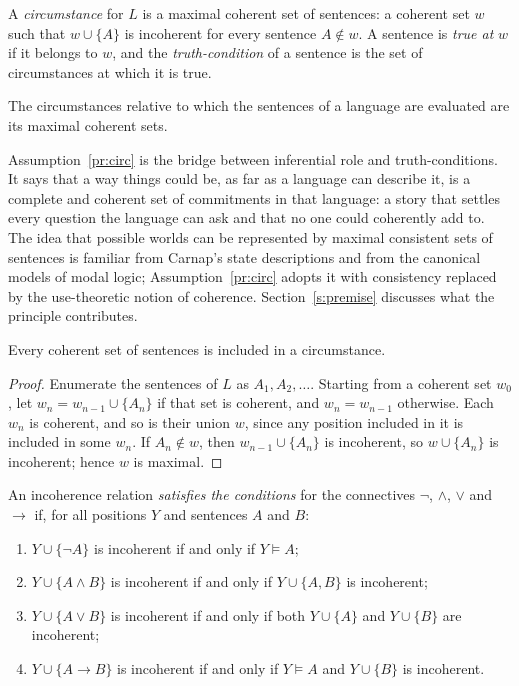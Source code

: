 \documentclass{situationist-preprint}
\begin{document}
\begin{definition}[Circumstance]\label{d:circ}
A \emph{circumstance} for $L$ is a maximal coherent set of sentences: a coherent set $w$ such that $w \cup \{A\}$ is incoherent for every sentence $A \notin w$. A sentence is \emph{true at} $w$ if it belongs to $w$, and the \emph{truth-condition} of a sentence is the set of circumstances at which it is true.
\end{definition}

\begin{assumption}[Circumstances]\label{pr:circ}
The circumstances relative to which the sentences of a language are evaluated are its maximal coherent sets.
\end{assumption}

Assumption~\ref{pr:circ} is the bridge between inferential role and truth-conditions. It says that a way things could be, as far as a language can describe it, is a complete and coherent set of commitments in that language: a story that settles every question the language can ask and that no one could coherently add to. The idea that possible worlds can be represented by maximal consistent sets of sentences is familiar from Carnap's state descriptions and from the canonical models of modal logic; Assumption~\ref{pr:circ} adopts it with consistency replaced by the use-theoretic notion of coherence. Section~\ref{s:premise} discusses what the principle contributes.

\begin{lemma}[Lindenbaum]\label{l:lind}
Every coherent set of sentences is included in a circumstance.
\end{lemma}

\begin{proof}
Enumerate the sentences of $L$ as $A_1, A_2, \ldots$. Starting from a coherent set $w_0$, let $w_{n} = w_{n-1} \cup \{A_n\}$ if that set is coherent, and $w_n = w_{n-1}$ otherwise. Each $w_n$ is coherent, and so is their union $w$, since any position included in it is included in some $w_n$. If $A_n \notin w$, then $w_{n-1} \cup \{A_n\}$ is incoherent, so $w \cup \{A_n\}$ is incoherent; hence $w$ is maximal.
\end{proof}

\begin{definition}\label{d:conds}
An incoherence relation \emph{satisfies the conditions} for the connectives $\neg$, $\wedge$, $\vee$ and $\to$ if, for all positions $Y$ and sentences $A$ and $B$:
\begin{enumerate}[label=(\alph*)]
\item $Y \cup \{\neg A\}$ is incoherent if and only if $Y \models A$;
\item $Y \cup \{A \wedge B\}$ is incoherent if and only if $Y \cup \{A, B\}$ is incoherent;
\item $Y \cup \{A \vee B\}$ is incoherent if and only if both $Y \cup \{A\}$ and $Y \cup \{B\}$ are incoherent;
\item $Y \cup \{A \to B\}$ is incoherent if and only if $Y \models A$ and $Y \cup \{B\}$ is incoherent.
\end{enumerate}
\end{definition}
\end{document}
